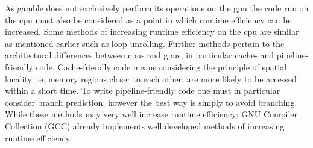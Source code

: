 As \gls{gamble} does not exclusively perform its operations on the \acrshort{gpu} the code run on the \acrshort{cpu} must also be considered as a point in which runtime efficiency can be increased.
Some methods of increasing runtime efficiency on the \acrshort{cpu} are similar as mentioned earlier such as loop unrolling.
Further methods pertain to the architectural differences between \acrshort{cpu}s and \acrshort{gpu}s, in particular cache- and pipeline-friendly code.
Cache-friendly code means considering the principle of spatial locality i.e. memory regions closer to each other, are more likely to be accessed within a short time.
To write pipeline-friendly code one must in particular consider branch prediction, however the best way is simply to avoid branching. \citep{CCodeOpt}
While these methods may very well increase runtime efficiency; GNU Compiler Collection (GCC) already implements well developed methods of increasing runtime efficiency.